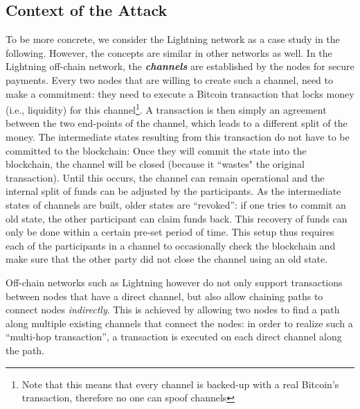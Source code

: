 \subsection{Context of the Attack}
To be more concrete, we consider the Lightning network
as a case study in the following. However, the concepts are similar
in other networks as well. 
In the Lightning off-chain network, the \emph{\textbf{channels}} are established
by the nodes for secure payments. 
Every two nodes that are willing to create such a channel,
need to make a commitment: they need to execute a Bitcoin transaction that locks
money (i.e., liquidity) for this channel\footnote{Note that this means that every channel is backed-up with a real Bitcoin's transaction, therefore no one can spoof channels}.
A transaction is then simply an agreement between the two end-points
of the channel, which leads to a different split of the money. 
The intermediate states resulting from this transaction
do not have to be committed to the blockchain: Once they will commit the state into the blockchain, the channel will be closed (because it ``wastes" the original transaction). Until this occurs, the channel can remain operational and the internal split of funds can be adjusted by the participants. 
As the intermediate states of channels are built, older states are ``revoked'': if one tries to commit an old state, the other participant can claim funds back. This recovery of funds can only be done within a certain pre-set period of time. This setup thus requires each of the participants in a channel to occasionally check the blockchain and make sure that the other party did not close the channel using an old state. 

Off-chain networks such as Lightning however do not only support transactions between
nodes that have a direct channel, but also allow chaining paths to connect nodes \emph{indirectly}. 
This is achieved by allowing two nodes to find a path along multiple existing channels that 
connect the nodes: in order to realize such a ``multi-hop transaction'',
a transaction is executed on each direct channel along the path. 

